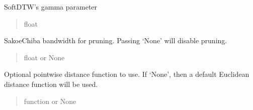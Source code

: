 \documentclass[letterpaper,10pt,english]{sphinxmanual}
\begin{document}
\begin{fulllineitems}
\begin{fulllineitems}
\label{\detokenize{dtw_loss_functions.soft_dtw_implementations.soft_dtw_cuda_mag:dtw_loss_functions.soft_dtw_implementations.soft_dtw_cuda_mag.SoftDTW.gamma}}
\pysigstartsignatures
\pysigline
{}
\pysigstopsignatures
\sphinxAtStartPar
SoftDTW’s gamma parameter
\begin{quote}\begin{description}
\sphinxAtStartPar
float

\end{description}\end{quote}

\end{fulllineitems}


\begin{fulllineitems}
\label{\detokenize{dtw_loss_functions.soft_dtw_implementations.soft_dtw_cuda_mag:dtw_loss_functions.soft_dtw_implementations.soft_dtw_cuda_mag.SoftDTW.bandwidth}}
\pysigstartsignatures
\pysigline
{}
\pysigstopsignatures
\sphinxAtStartPar
Sakoe\sphinxhyphen{}Chiba bandwidth for pruning. Passing ‘None’ will disable pruning.
\begin{quote}\begin{description}
\sphinxAtStartPar
float or None

\end{description}\end{quote}

\end{fulllineitems}


\begin{fulllineitems}
\label{\detokenize{dtw_loss_functions.soft_dtw_implementations.soft_dtw_cuda_mag:dtw_loss_functions.soft_dtw_implementations.soft_dtw_cuda_mag.SoftDTW.dist_func}}
\pysigstartsignatures
\pysigline
{}
\pysigstopsignatures
\sphinxAtStartPar
Optional point\sphinxhyphen{}wise distance function to use. If ‘None’, then a default Euclidean distance function will be used.
\begin{quote}\begin{description}
\sphinxAtStartPar
function or None


\end{description}
\end{quote}
\end{fulllineitems}
\end{fulllineitems}
\end{document}
